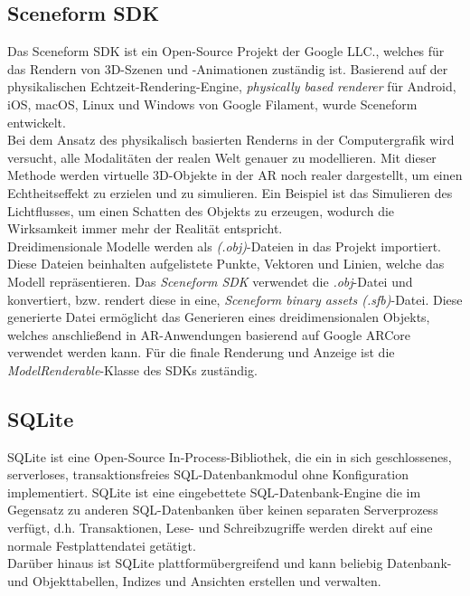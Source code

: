 \subsection{Sceneform SDK}
Das Sceneform \acs{SDK} ist ein Open-Source Projekt der Google LLC., welches für das Rendern von 3D-Szenen und -Animationen zuständig ist. 
Basierend auf der physikalischen Echtzeit-Rendering-Engine, \textit{physically based renderer} für Android, iOS, macOS, Linux und Windows 
von Google Filament, wurde Sceneform entwickelt. \cite{sceneform.2020}
\\ 
\linebreak
Bei dem Ansatz des physikalisch basierten Renderns in der Computergrafik wird versucht, alle Modalitäten der realen Welt genauer zu modellieren. 
Mit dieser Methode werden virtuelle 3D-Objekte in der \acl{AR} noch realer dargestellt, um einen Echtheitseffekt zu erzielen und zu simulieren. 
Ein Beispiel ist das Simulieren des Lichtflusses, um einen Schatten des Objekts zu erzeugen, wodurch die Wirksamkeit immer mehr der Realität 
entspricht.
\\ 
\linebreak
Dreidimensionale Modelle werden als \textit{(.obj)}-Dateien in das Projekt importiert. Diese Dateien beinhalten aufgelistete Punkte, Vektoren 
und Linien, welche das Modell repräsentieren. Das \textit{Sceneform \acs{SDK}} verwendet die \textit{.obj}-Datei und konvertiert, bzw. 
rendert diese in eine, \textit{Sceneform binary assets (.sfb)}-Datei. Diese generierte Datei ermöglicht das Generieren eines dreidimensionalen 
Objekts, welches anschließend in \acs{AR}-Anwendungen basierend auf Google ARCore verwendet werden kann. 
Für die finale Renderung und Anzeige ist die \textit{ModelRenderable}-Klasse des \acs{SDK}s zuständig. 
\subsection{SQLite}
\acs{SQL}ite ist eine Open-Source In-Process-Bibliothek, die ein in sich geschlossenes, serverloses, transaktionsfreies \acs{SQL}-Datenbankmodul 
ohne Konfiguration implementiert. \acs{SQL}ite ist eine eingebettete \acs{SQL}-Datenbank-Engine die im Gegensatz zu anderen \acs{SQL}-Datenbanken über 
keinen separaten Serverprozess verfügt, d.h. Transaktionen, Lese- und Schreibzugriffe werden direkt auf eine normale Festplattendatei getätigt. \cite{sqlite.2018j}
\\
Darüber hinaus ist \acs{SQL}ite plattformübergreifend und kann beliebig Datenbank- und Objekttabellen, Indizes und Ansichten erstellen und verwalten.